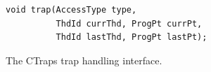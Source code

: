 \documentclass[preprint,9pt]{sigplanconf}
\newcommand{\ctraps}{CTraps\xspace}
\newcommand{\lwt}{LWT\xspace}
\begin{document}
\begin{figure}[htb]
\centering
\begin{verbatim}
void trap(AccessType type, 
          ThdId currThd, ProgPt currPt,
          ThdId lastThd, ProgPt lastPt);
\end{verbatim}
\caption{\label{fig:hookapi}The \ctraps trap handling interface.}
\end{figure}


%
%
\end{document}

